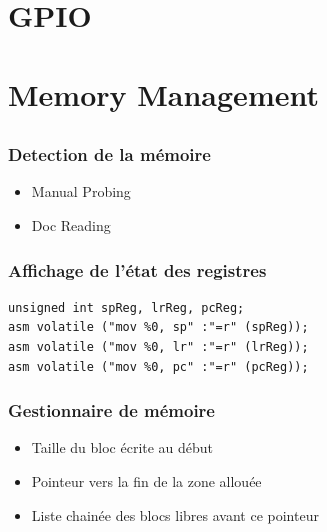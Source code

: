 \documentclass{beamer}
\begin{document}


\begin{frame}
\frametitle{ }
\end{frame}

\section{GPIO}
\subsection{ }

\begin{frame}
\frametitle{ }
\end{frame}

\section{Memory Management}
\subsection{ }
\begin{frame}
  \frametitle{Detection de la mémoire}
  \begin{itemize}
  \item Manual Probing
  \item Doc Reading
  \end{itemize}
\end{frame}

\begin{frame}[fragile]
  \frametitle{Affichage de l'état des registres}
\begin{lstlisting}  
unsigned int spReg, lrReg, pcReg;    
asm volatile ("mov %0, sp" :"=r" (spReg));   
asm volatile ("mov %0, lr" :"=r" (lrReg));
asm volatile ("mov %0, pc" :"=r" (pcReg));
\end{lstlisting}
\end{frame}

\begin{frame}
  \frametitle{Gestionnaire de mémoire}
  \begin{itemize}
  \item Taille du bloc écrite au début
  \item Pointeur vers la fin de la zone allouée
  \item Liste chainée des blocs libres avant ce pointeur
  \end{itemize}
\end{frame}
\end{document}
